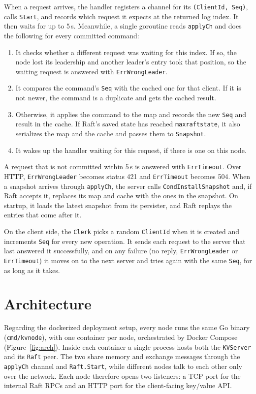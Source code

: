 \documentclass[conference]{IEEEtran}
\begin{document}
When a request arrives, the handler registers a channel for its \texttt{(ClientId, Seq)}, calls \texttt{Start}, and records which request it expects at the returned log index. It then waits for up to 5\,s. Meanwhile, a single goroutine reads \texttt{applyCh} and does the following for every committed command:
\begin{enumerate}
\item It checks whether a different request was waiting for this index. If so, the node lost its leadership and another leader's entry took that position, so the waiting request is answered with \texttt{ErrWrongLeader}.
\item It compares the command's \texttt{Seq} with the cached one for that client. If it is not newer, the command is a duplicate and gets the cached result.
\item Otherwise, it applies the command to the map and records the new \texttt{Seq} and result in the cache. If Raft's saved state has reached \texttt{maxraftstate}, it also serializes the map and the cache and passes them to \texttt{Snapshot}.
\item It wakes up the handler waiting for this request, if there is one on this node.
\end{enumerate}
A request that is not committed within 5\,s is answered with \texttt{ErrTimeout}. Over HTTP, \texttt{ErrWrongLeader} becomes status 421 and \texttt{ErrTimeout} becomes 504. When a snapshot arrives through \texttt{applyCh}, the server calls \texttt{CondInstallSnapshot} and, if Raft accepts it, replaces its map and cache with the ones in the snapshot. On startup, it loads the latest snapshot from its persister, and Raft replays the entries that come after it.

On the client side, the \texttt{Clerk} picks a random \texttt{ClientId} when it is created and increments \texttt{Seq} for every new operation. It sends each request to the server that last answered it successfully, and on any failure (no reply, \texttt{ErrWrongLeader} or \texttt{ErrTimeout}) it moves on to the next server and tries again with the same \texttt{Seq}, for as long as it takes.

\section{Architecture}\label{sec:arch}
Regarding the dockerized deployment setup, every node runs the same Go binary (\texttt{cmd/kvnode}), with one container per node, orchestrated by Docker Compose (Figure~\ref{fig:arch}).  Inside each container a single process hosts both the \texttt{KVServer} and its \texttt{Raft} peer. The two share memory and exchange messages through the \texttt{applyCh} channel and \texttt{Raft.Start}, while different nodes talk to each other only over the network. Each node therefore opens two listeners: a TCP port for the internal Raft RPCs and an HTTP port for the client-facing key/value API\@.
\end{document}
